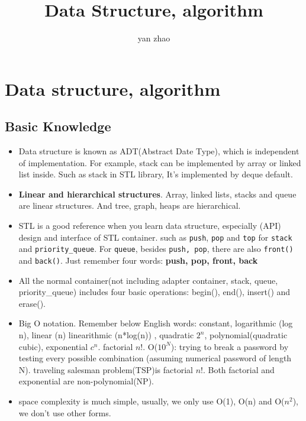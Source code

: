 \documentclass[a4paper,11pt,twoside]{book}
\begin{document}
\title{Data Structure, algorithm}
\author{yan zhao}
\date{}\maketitle

\setcounter{secnumdepth}{4}
\setcounter{tocdepth}{4}
\tableofcontents


\chapter{Data structure, algorithm} 

\section{Basic Knowledge}
\begin{itemize}
	\item Data structure is known as ADT(Abstract Date Type),  which is independent of implementation. For example, stack can be implemented by array or linked list inside. Such as stack in STL library, It's implemented by deque default.   
	
	\item \textbf{Linear and hierarchical structures}. Array, linked lists, stacks and queue are linear structures. And tree, graph, heaps are hierarchical.
	
	\item STL is a good reference when you learn data structure, especially (API) design and interface of STL container. such as \texttt{push}, \texttt{pop}  and \texttt{top} for \texttt{stack} and \texttt{priority\_queue}. For \texttt{queue}, besides \texttt{push, pop},  there are also \texttt{front()} and \texttt{back()}. Just remember four words: \textbf{push, pop, front, back}
	
	\item All the normal container(not including adapter container, stack, queue, priority\_queue) includes four basic operations: begin(), end(), insert() and erase(). 
	
	\item Big O notation. Remember below English words: constant, logarithmic (log n), linear (n)  linearithmic (n*log(n)) , quadratic $2^{n}$, polynomial(quadratic cubic),  exponential $c^{n}$.  factorial $n!$.  O($10^{N}$): trying to break a password by testing every possible combination (assuming numerical password of length N).  traveling salesman problem(TSP)is factorial $n!$.  Both factorial and exponential are non-polynomial(NP). 
	
	\item space complexity is much simple, usually, we only use O(1), O(n) and O($n^{2}$), we don't use other forms.  
\end{itemize}
\end{document}
